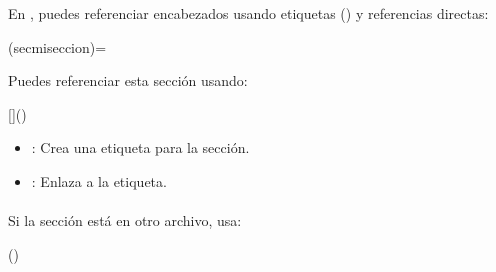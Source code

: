 \documentclass[a4paper,10pt,oneside,spanish,openany]{sphinxmanual}
\begin{document}
\subsubsection{}
\label{\detokenize{configuracion_inicial/013.guia_de_myst_parser:referencias-cruzadas-a-secciones}}

\paragraph{}
\label{\detokenize{configuracion_inicial/013.guia_de_myst_parser:id6}}
\sphinxAtStartPar
En , puedes referenciar encabezados usando etiquetas (\sphinxcode{\sphinxupquote{\#}}) y referencias directas:

\begin{sphinxVerbatim}[commandchars=\\\{\}]
(sec\PYGZhy{}mi\PYGZhy{}seccion)=

Puedes referenciar esta sección usando:

[]()
\end{sphinxVerbatim}
\begin{itemize}
\item {} 
\sphinxAtStartPar
{}: Crea una etiqueta para la sección.

\item {} 
\sphinxAtStartPar
{}: Enlaza a la etiqueta.

\end{itemize}


\paragraph{}
\label{\detokenize{configuracion_inicial/013.guia_de_myst_parser:referencia-desde-otro-archivo}}
\sphinxAtStartPar
Si la sección está en otro archivo, usa:

\begin{sphinxVerbatim}()
\end{sphinxVerbatim}
\end{document}
